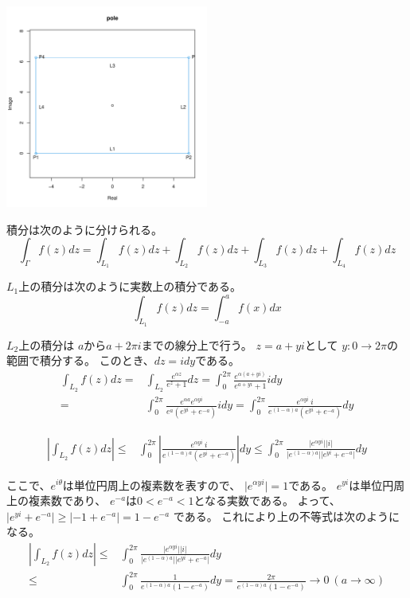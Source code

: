 \documentclass[12pt,b5paper]{ltjsarticle}
\begin{document}
\centerline{\includegraphics[width=0.5\textwidth]{pole_plot_R.pdf}}

積分は次のように分けられる。
\begin{equation}
 \int_{\Gamma} f(z) dz
  =\int_{L_1} f(z) dz + \int_{L_2} f(z) dz
  +\int_{L_3} f(z) dz + \int_{L_4} f(z) dz
\end{equation}

$L_1$上の積分は次のように実数上の積分である。
\begin{equation}
 \int_{L_1} f(z) dz = \int_{-a}^{a} f(x) dx
\end{equation}

$L_2$上の積分は
$a$から$a+2\pi i$までの線分上で行う。
$z=a+yi$として
$y : 0\to2\pi$の範囲で積分する。
このとき、$dz=i dy$である。
\begin{align}
 \int_{L_2} f(z) dz
  =& \int_{L_2} \frac{e^{\alpha z}}{e^{z}+1} dz
  = \int_{0}^{2\pi}
  \frac{e^{\alpha (a+yi)}}{e^{a+yi}+1}
  i dy\\
  =& \int_{0}^{2\pi}
  \frac{ e^{\alpha a} e^{\alpha yi} }{ e^{a}(e^{yi} +e^{-a}) }
  i dy
  = \int_{0}^{2\pi}
  \frac{ e^{\alpha yi}\ i }{ e^{(1-\alpha)a}(e^{yi} +e^{-a}) }
  dy
\end{align}

\begin{align}
 \left\lvert \int_{L_2} f(z) dz \right\rvert
 \leq &  \int_{0}^{2\pi} \left\lvert
 \frac{ e^{\alpha yi}\ i }{ e^{(1-\alpha)a}(e^{yi} +e^{-a}) }
 \right\rvert dy
 \leq \int_{0}^{2\pi}
 \frac{ \lvert e^{\alpha yi} \rvert \lvert i \rvert}{ \lvert e^{(1-\alpha)a} \rvert \lvert e^{yi} +e^{-a} \rvert }
 dy
\end{align}

ここで、$e^{i\theta}$は単位円周上の複素数を表すので、
$\lvert e^{\alpha yi} \rvert =1$である。
$e^{yi}$は単位円周上の複素数であり、
$e^{-a}$は$0<e^{-a}<1$となる実数である。
よって、
$\lvert e^{yi} +e^{-a} \rvert \geq \lvert -1 + e^{-a} \rvert =1-e^{-a}$
である。
これにより上の不等式は次のようになる。
\begin{align}
 \left\lvert \int_{L_2} f(z) dz \right\rvert
  \leq & \int_{0}^{2\pi}
 \frac{ \lvert e^{\alpha yi} \rvert \lvert i \rvert}{ \lvert e^{(1-\alpha)a} \rvert \lvert e^{yi} +e^{-a} \rvert }
 dy\\
 \leq & \int_{0}^{2\pi}
 \frac{1}{ e^{(1-\alpha)a}(1 -e^{-a}) }dy
 = \frac{2\pi}{ e^{(1-\alpha)a}(1 -e^{-a}) }
 \to 0 \ (a\to\infty)
\end{align}
\end{document}
